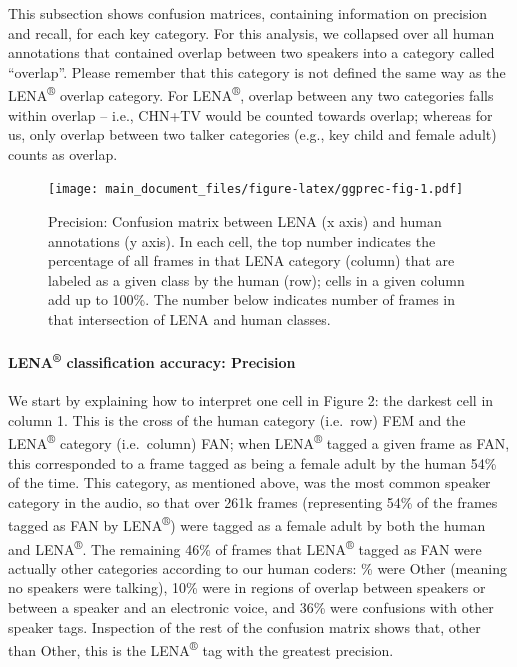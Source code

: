 \documentclass[english,table,man,floatsintext]{apa6}
\let\oldparagraph\paragraph
\renewcommand{\paragraph}[1]{\oldparagraph{#1}\mbox{}}
\begin{document}
This subsection shows confusion matrices, containing information on precision and recall, for each key category. For this analysis, we collapsed over all human annotations that contained overlap between two speakers into a category called \enquote{overlap}. Please remember that this category is not defined the same way as the LENA\textsuperscript{®} overlap category. For LENA\textsuperscript{®}, overlap between any two categories falls within overlap -- i.e., CHN+TV would be counted towards overlap; whereas for us, only overlap between two talker categories (e.g., key child and female adult) counts as overlap.

\begin{figure}
\centering
\texttt{[image: main\_document\_files/figure-latex/ggprec-fig-1.pdf]}
\caption{\label{fig:ggprec-fig}Precision: Confusion matrix between LENA (x axis) and human annotations (y axis). In each cell, the top number indicates the percentage of all frames in that LENA category (column) that are labeled as a given class by the human (row); cells in a given column add up to 100\%. The number below indicates number of frames in that intersection of LENA and human classes.}
\end{figure}

\hypertarget{lena-classification-accuracy-precision}{%
\paragraph{\texorpdfstring{LENA\textsuperscript{®} classification accuracy: Precision}{LENA® classification accuracy: Precision}}\label{lena-classification-accuracy-precision}}

We start by explaining how to interpret one cell in Figure 2: the darkest cell in column 1. This is the cross of the human category (i.e.~row) FEM and the LENA\textsuperscript{®} category (i.e.~column) FAN; when LENA\textsuperscript{®} tagged a given frame as FAN, this corresponded to a frame tagged as being a female adult by the human 54\% of the time. This category, as mentioned above, was the most common speaker category in the audio, so that over 261k frames (representing 54\% of the frames tagged as FAN by LENA\textsuperscript{®}) were tagged as a female adult by both the human and LENA\textsuperscript{®}. The remaining 46\% of frames that LENA\textsuperscript{®} tagged as FAN were actually other categories according to our human coders: \% were Other (meaning no speakers were talking), 10\% were in regions of overlap between speakers or between a speaker and an electronic voice, and 36\% were confusions with other speaker tags. Inspection of the rest of the confusion matrix shows that, other than Other, this is the LENA\textsuperscript{®} tag with the greatest precision.
\end{document}
